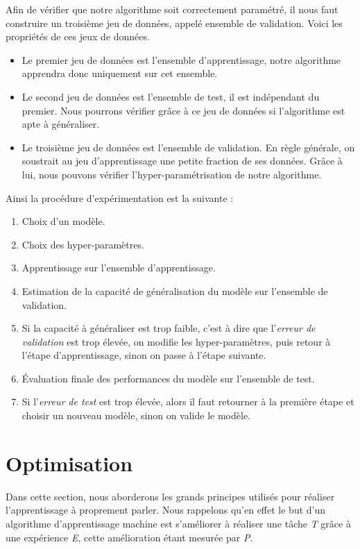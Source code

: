 \documentclass[a4paper, 11pt]{report}
\begin{document}
Afin de vérifier que notre algorithme soit correctement paramétré, il nous faut construire un troisième jeu de données, appelé ensemble de validation.
Voici les propriétés de ces jeux de données.
\begin{itemize}
	\item Le premier jeu de données est l'ensemble d'apprentissage, notre algorithme apprendra donc uniquement sur cet ensemble.
	\item Le second jeu de données est l'ensemble de test, il est indépendant du premier. Nous pourrons vérifier grâce à ce jeu de données si l'algorithme est apte à généraliser.
	\item Le troisième jeu de données est l'ensemble de validation. En règle générale, on soustrait au jeu d'apprentissage une petite fraction de ses données. Grâce à lui, nous pouvons vérifier l'hyper-paramétrisation de notre algorithme.
\end{itemize}
Ainsi la procédure d'expérimentation est la suivante :
\begin{enumerate}
	\item Choix d'un modèle.
	\item Choix des hyper-paramètres.
	\item Apprentissage sur l'ensemble d'apprentissage.
	\item Estimation de la capacité de généralisation du modèle sur l'ensemble de validation.
	\item Si la capacité à généraliser est trop faible, c'est à dire que l'\emph{erreur de validation} est trop élevée, on modifie les hyper-paramètres, puis retour à l'étape d'apprentissage, sinon on passe à l'étape suivante.
	\item Évaluation finale des performances du modèle sur l'ensemble de test.
	\item Si l'\emph{erreur de test} est trop élevée, alors il faut retourner à la première étape et choisir un nouveau modèle, sinon on valide le modèle.
\end{enumerate}
	
\section{Optimisation}
Dans cette section, nous aborderons les grands principes utilisés pour réaliser l'apprentissage à proprement parler.
Nous rappelons qu'en effet le but d'un algorithme d'apprentissage machine est s'améliorer à réaliser une tâche \emph{T} grâce à une expérience \emph{E}, cette amélioration étant mesurée par \emph{P}.
\end{document}
